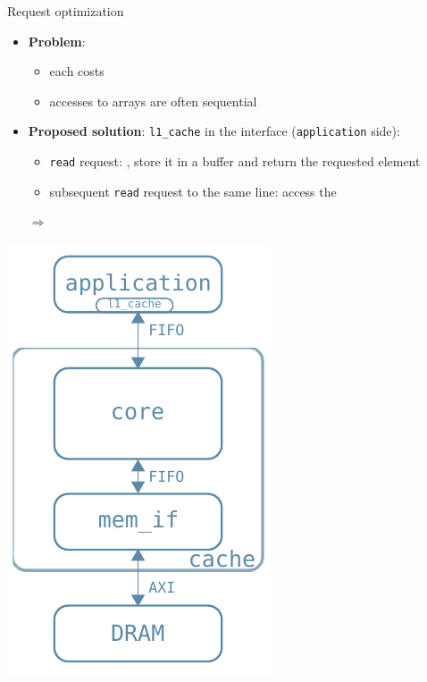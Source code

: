 \documentclass[handout]{beamer}
\begin{document}
\begin{frame}{Request optimization}
	\begin{minipage}{.7\textwidth}
		\begin{itemize}[<+->]
			\item \textbf{Problem}:
				\begin{itemize}[<.->]
					\item each  costs
					\item accesses to arrays are often sequential
				\end{itemize}
			\item \textbf{Proposed solution}:
				\texttt{l1\_cache} in the interface (\texttt{application}
				side):
				\begin{itemize}[<.->]
					\item \texttt{read} request:
						,
						store it in a buffer and return
						the requested element
					\item subsequent \texttt{read} request to the same
						line: access the 
				\end{itemize}
				$\Rightarrow$ 
		\end{itemize}
	\end{minipage}
	\begin{minipage}{.28\textwidth}
		\begin{center}
			\includegraphics[width=.9\textwidth]{l1_arch.pdf}

\end{center}
\end{minipage}
\end{frame}
\end{document}
